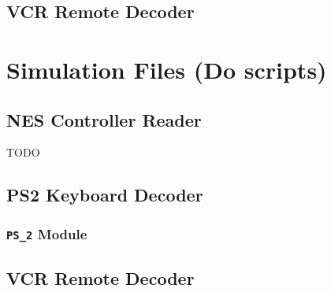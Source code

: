 \documentclass[a4paper]{article}
\makeatletter
\newcommand{\filecaption}[1]{\filename@parse{#1}\filename@base.\filename@ext}
\newcommand{\filelisting}[2][]{%
}
\makeatother
\begin{document}
\subsection{VCR Remote Decoder}
\filelisting[label=lst:sv_vcr_ir_decoder]{../verilog/vcr_remote/ir_decoder.sv}
\filelisting[label=lst:sv_vcr_ir_signal_transcriber]{../verilog/vcr_remote/ir_signal_transcriber.sv}
\filelisting[label=lst:sv_vcr_sync_counter]{../verilog/vcr_remote/sync_counter.sv}
\filelisting[label=lst:sv_vcr_counter]{../verilog/vcr_remote/counter.sv}
\filelisting[label=lst:sv_vcr_sync]{../verilog/vcr_remote/sync.sv}
\filelisting[label=lst:sv_vcr_shiftreg]{../verilog/vcr_remote/shiftreg.sv}
\filelisting[label=lst:sv_vcr_checksum_validator]{../verilog/vcr_remote/checksum_validator.sv}
\filelisting[label=lst:sv_vcr_ir_code_decoder]{../verilog/vcr_remote/ir_code_decoder.sv}

\section{Simulation Files (Do scripts)}

\subsection{NES Controller Reader}
TODO

\subsection{PS2 Keyboard Decoder}

\subsubsection{\texttt{PS\_2} Module}
\filelisting[label=lst:sim_ps2_ps_2]{../do_files/ps2/PS2.do}

\subsection{VCR Remote Decoder}
\end{document}
